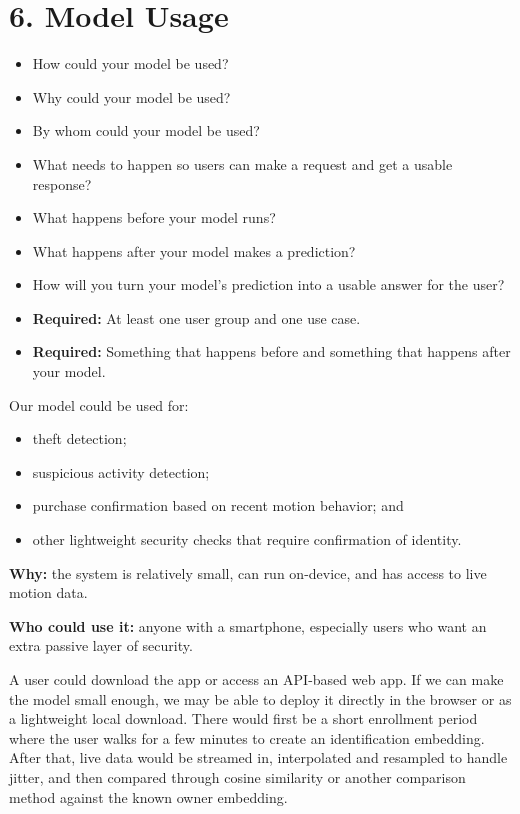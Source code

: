 \documentclass[11pt]{article}
\begin{document}
\section{6. Model Usage}
\begin{itemize}
    \item How could your model be used?
    \item Why could your model be used?
    \item By whom could your model be used?
    \item What needs to happen so users can make a request and get a usable response?
    \item What happens before your model runs?
    \item What happens after your model makes a prediction?
    \item How will you turn your model's prediction into a usable answer for the user?
    \item \textbf{Required:} At least one user group and one use case.
    \item \textbf{Required:} Something that happens before and something that happens after your model.
\end{itemize}

Our model could be used for:
\begin{itemize}
    \item theft detection;
    \item suspicious activity detection;
    \item purchase confirmation based on recent motion behavior; and
    \item other lightweight security checks that require confirmation of identity.
\end{itemize}

\textbf{Why:} the system is relatively small, can run on-device, and has access to live motion data.

\textbf{Who could use it:} anyone with a smartphone, especially users who want an extra passive layer of security.

A user could download the app or access an API-based web app. If we can make the model small enough, we may be able to deploy it directly in the browser or as a lightweight local download. There would first be a short enrollment period where the user walks for a few minutes to create an identification embedding. After that, live data would be streamed in, interpolated and resampled to handle jitter, and then compared through cosine similarity or another comparison method against the known owner embedding.
\end{document}
